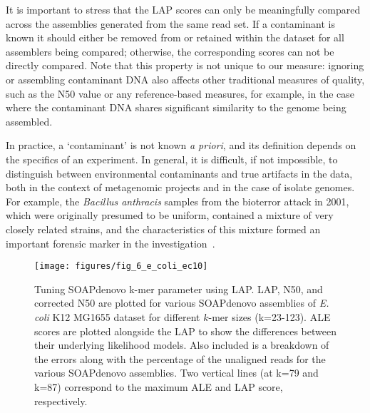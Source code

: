 It is important to stress that the LAP
scores can only be meaningfully compared across the assemblies generated
from the same read set.  If a contaminant is known it should either be
removed from or retained within the dataset for all assemblers being
compared; otherwise, the corresponding scores can not be directly
compared. Note that this property is not unique to our measure:
ignoring or assembling contaminant DNA also affects other
traditional measures of quality, such as the N50 value or any
reference-based measures, for example, in the case where the contaminant DNA
shares significant similarity to the genome being assembled.

In practice, a `contaminant' is not known \emph{a
  priori}, and its definition depends on the specifics of an experiment.  In
general, it is difficult, if not impossible, to distinguish between
environmental contaminants and true artifacts in the data, both
in the context of metagenomic projects and in the case of
isolate genomes.  For example, the \emph{Bacillus anthracis} samples
from the bioterror attack in 2001, which were originally presumed to be uniform,
contained a mixture of very closely related strains, and the
characteristics of this mixture formed an important forensic marker in
the investigation~\cite{rasko2011bacillus}.

\begin{figure}[ht!]
\begin{center}
 \texttt{[image: figures/fig\_6\_e\_coli\_ec10]}
\end{center}
\renewcommand{\baselinestretch}{1}
\small\normalsize
\begin{quote}
\caption[Tuning SOAPdenovo k-mer parameter using LAP scores.]{Tuning SOAPdenovo k-mer parameter using LAP.
  LAP, N50, and corrected N50 are plotted for various SOAPdenovo assemblies of \emph{E. coli} K12 MG1655 dataset for different $k$-mer sizes (k=23-123). ALE~\cite{clark2013ale} scores are plotted alongside the LAP to show the differences between their underlying likelihood models.
  Also included is a breakdown of the errors along with the percentage of the unaligned reads for the various SOAPdenovo assemblies. Two vertical lines (at k=79 and k=87) correspond to the maximum ALE and LAP score, respectively.}
\label{fig:e_coli}
\end{quote}
\end{figure}
\renewcommand{\baselinestretch}{2}
\small\normalsize

